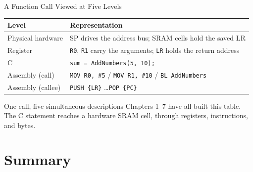 \documentclass[9pt,aspectratio=169,xcolor=table]{beamer}
\begin{document}
\begin{frame}{A Function Call Viewed at Five Levels}
    \begin{center}
    {\small
    \striped
    \begin{tabular}{@{}l R{.68\textwidth}@{}}
        \toprule
        \textbf{Level} & \textbf{Representation} \\
        \midrule
        Physical hardware   & SP drives the address bus; SRAM cells hold the saved LR \\
        Register            & \texttt{R0}, \texttt{R1} carry the arguments; \texttt{LR} holds the return address \\
        C                   & \texttt{sum = AddNumbers(5, 10);} \\
        Assembly (call)     & \texttt{MOV R0, \#5} / \texttt{MOV R1, \#10} / \texttt{BL AddNumbers} \\
        Assembly (callee)   & \texttt{PUSH \{LR\}} \ldots \texttt{POP \{PC\}} \\
        \bottomrule
    \end{tabular}}
    \end{center}

    \vspace{3mm}
    \begin{block}{One call, five simultaneous descriptions}
        Chapters 1--7 have all built this table. The C statement reaches
        a hardware SRAM cell, through registers, instructions, and bytes.
    \end{block}
\end{frame}


\section{Summary}
\end{document}
